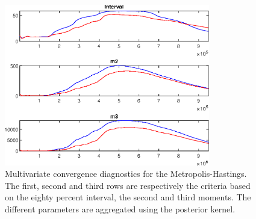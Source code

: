  
\begin{figure}[H]
\centering 
\includegraphics[width=0.8\textwidth]{BRS_growth_util_sectoral/Output/BRS_growth_util_sectoral_mdiag}
\caption{Multivariate convergence diagnostics for the Metropolis-Hastings.
The first, second and third rows are respectively the criteria based on
the eighty percent interval, the second and third moments. The different 
parameters are aggregated using the posterior kernel.}\label{Fig:MultivariateDiagnostics}
\end{figure}

